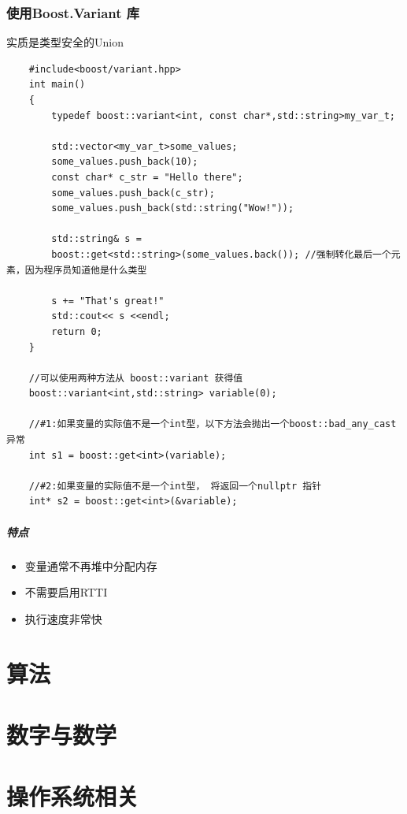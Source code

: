 \documentclass[UTF8,a4paper,12pt]{ctexbook}
\begin{document}
	\subsection{使用Boost.Variant 库}
		实质是类型安全的Union
	\begin{lstlisting}
	#include<boost/variant.hpp>
	int main()
	{
		typedef boost::variant<int, const char*,std::string>my_var_t;
		
		std::vector<my_var_t>some_values;
		some_values.push_back(10);
		const char* c_str = "Hello there";
		some_values.push_back(c_str);
		some_values.push_back(std::string("Wow!"));
		
		std::string& s = 
		boost::get<std::string>(some_values.back()); //强制转化最后一个元素，因为程序员知道他是什么类型
		
		s += "That's great!"
		std::cout<< s <<endl;	
		return 0;
	}
	
	//可以使用两种方法从 boost::variant 获得值
	boost::variant<int,std::string> variable(0);
	
	//#1:如果变量的实际值不是一个int型，以下方法会抛出一个boost::bad_any_cast 异常
	int s1 = boost::get<int>(variable);
	
	//#2:如果变量的实际值不是一个int型， 将返回一个nullptr 指针
	int* s2 = boost::get<int>(&variable);
	\end{lstlisting}
	
		\paragraph{特点}
		\begin{itemize}
			\item 变量通常不再堆中分配内存
			\item 不需要启用RTTI
			\item 执行速度非常快
		\end{itemize}
\newpage
\chapter{算法}


\newpage
\chapter{数字与数学}


\newpage
\chapter{操作系统相关}


\newpage
\end{document}
